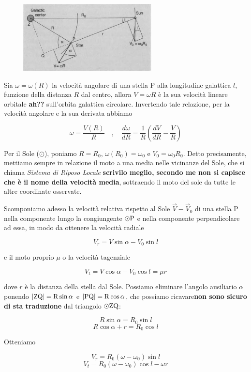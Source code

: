 \begin{figure}[H]
    \centering
    \includegraphics[width=7cm]{immagini/parametri_Oort_1.png}
\end{figure}

Sia $\omega=\omega(R)$ la velocità angolare di una stella P alla longitudine galattica $l$, funzione della distanza $R$ dal centro, allora $V=\omega R$ è la sua velocità lineare orbitale \textbf{ah??} sull'orbita galattica circolare. Invertendo tale relazione, per la velocità angolare e la sua derivata abbiamo

$$\omega=\frac{V(R)}{R}
\quad,\quad
\frac{d\omega}{dR}=\frac{1}{R} \left( \frac{dV}{dR} - \frac{V}{R} \right)$$

Per il Sole ($\odot$), poniamo $R=R_0$, $\omega(R_0)=\omega_0$ e $V_0=\omega_0R_0$. Detto precisamente, mettiamo sempre in relazione il moto a una media nelle vicinanze del Sole, che si chiama \textit{Sistema di Riposo Locale} \textbf{scrivilo meglio, secondo me non si capisce che è il nome della velocità media}, sottraendo il moto del sole da tutte le altre coordinate osservate.

Scomponiamo adesso la velocità relativa rispetto al Sole $\vec{V} - \vec{V}_0$ di una stella P nella componente lungo la congiungente $\rm \odot P$ e nella componente perpendicolare ad essa, in modo da ottenere la velocità radiale

$$V_r=V \sin{\alpha} - V_0 \sin l$$

e il moto proprio $\mu$ o la velocità tagenziale

$$V_t=V \cos{\alpha} - V_0 \cos l=\mu r$$

dove $r$ è la distanza della stella dal Sole. Possiamo eliminare l'angolo ausiliario $\alpha$ ponendo $\rm |ZQ|=R \sin{\alpha}$ e $\rm |PQ|=R\cos{\alpha}$, che possiamo ricavare\textbf{non sono sicuro di sta traduzione} dal triangolo $\rm \odot ZQ$:

$$R \sin{\alpha}=R_0 \sin l$$
$$R \cos{\alpha} + r= R_0 \cos{l}$$

Otteniamo

$$V_r=R_0(\omega - \omega_0) \sin{l}$$
$$V_t=R_0(\omega - \omega_0) \cos{l} - \omega r$$

